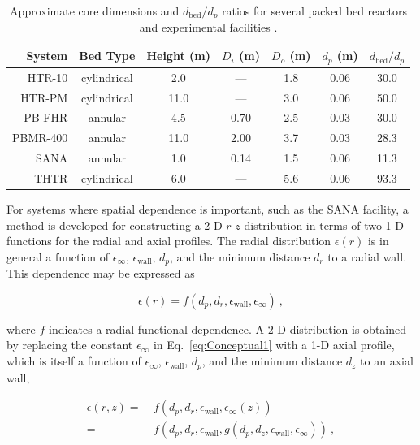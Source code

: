 \begin{table}[!h]
\caption{Approximate core dimensions and \(d_\text{bed}/d_p\) ratios for several packed bed reactors and experimental facilities \cite{gao,htrpm,pbfhr,boer,SANA,thtr_1990}.}
\centering
\begin{tabular}{|r |c| c c c c c|}
\hline\hline
System & Bed Type & Height (m) & \(D_i\) (m) & \(D_o\) (m) & \(d_p\) (m) & \(d_\text{bed}/d_p\)\Tstrut\Bstrut \\
\hline
HTR-10 & cylindrical & \hspace{0.5em}2.0 & --- & 1.8 & 0.06 & 30.0\Tstrut\\
HTR-PM & cylindrical & 11.0 & --- & 3.0 & 0.06 & 50.0\\
PB-FHR & annular & \hspace{0.5em}4.5 & 0.70 & 2.5 & 0.03 & 30.0\\
PBMR-400 & annular & 11.0 & 2.0\color{white}0\color{black}& 3.7 & 0.03 & 28.3\\
SANA & annular & \hspace{0.5em}1.0 & 0.14 & 1.5 & 0.06 & 11.3\\
THTR & cylindrical & \hspace{0.5em}6.0 & --- & 5.6 & 0.06 & 93.3\Bstrut\\
\hline
\end{tabular}
\label{table:DpDbed}
\end{table}

For systems where spatial dependence is important, such as the SANA facility, a method is developed for constructing a 2-D \(r\)-\(z\) distribution in terms of two 1-D functions for the radial and axial profiles. The radial distribution \(\epsilon(r)\) is in general a function of \(\epsilon_\infty\), \(\epsilon_\text{wall}\), \(d_p\), and the minimum distance \(d_r\) to a radial wall. This dependence may be expressed as

\begin{equation}
\label{eq:Conceptual1}
\epsilon(r)=f\left(d_p, d_r, \epsilon_\text{wall},\epsilon_\infty\right)\ ,
\end{equation}

\noindent where \(f\) indicates a radial functional dependence. A 2-D distribution is obtained by replacing the constant \(\epsilon_\infty\) in Eq.\ \eqref{eq:Conceptual1} with a 1-D axial profile, which is itself a function of \(\epsilon_\infty\), \(\epsilon_\text{wall}\), \(d_p\), and the minimum distance \(d_z\) to an axial wall,

\begin{equation}
\begin{aligned}
\label{eq:Conceptual}
\epsilon(r,z)=&\ f\left(d_p, d_r, \epsilon_\text{wall}, \epsilon_\infty(z)\right)\\
=&\ f\left(d_p, d_r, \epsilon_\text{wall}, g\left(d_p, d_z, \epsilon_\text{wall}, \epsilon_\infty\right)\right)\ ,
\end{aligned}
\end{equation}

